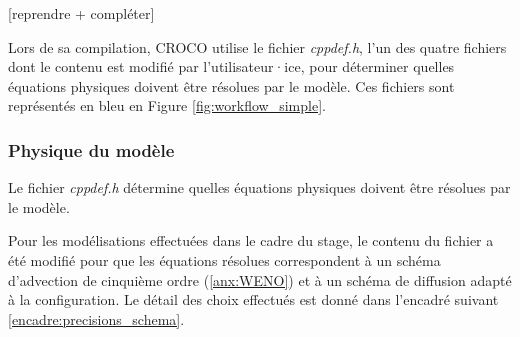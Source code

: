 \documentclass[10pt,a4paper,titlepage]{article}
\begin{document}
[reprendre + compléter]

Lors de sa compilation, CROCO utilise le fichier \textit{cppdef.h}, l'un des quatre fichiers dont le contenu est modifié par l'utilisateur·ice, pour déterminer quelles équations physiques doivent être résolues par le modèle.
Ces fichiers sont représentés en bleu en Figure \ref{fig:workflow_simple}.




\subsubsection{Physique du modèle}
\label{subsub:pysique_modele}
Le fichier \textit{cppdef.h} détermine quelles équations physiques doivent être résolues par le modèle.

Pour les modélisations effectuées dans le cadre du stage, le contenu du fichier a été modifié pour que les équations résolues correspondent à un schéma d'advection de cinquième ordre (\ref{anx:WENO}) et à un schéma de diffusion adapté à la configuration.
Le détail des choix effectués est donné dans l'encadré suivant \ref{encadre:precisions_schema}.
\end{document}
